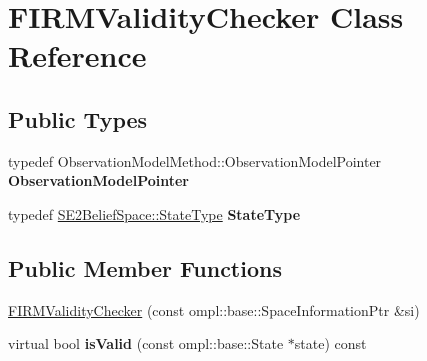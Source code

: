 \hypertarget{class_f_i_r_m_validity_checker}{\section{\-F\-I\-R\-M\-Validity\-Checker \-Class \-Reference}
\label{class_f_i_r_m_validity_checker}
}
\subsection*{\-Public \-Types}
\begin{DoxyCompactItemize}
\item 
\hypertarget{class_f_i_r_m_validity_checker_ac646cd30f5012f2bd3298f3c93189867}{typedef \*
\-Observation\-Model\-Method\-::\-Observation\-Model\-Pointer {\bfseries \-Observation\-Model\-Pointer}}\label{class_f_i_r_m_validity_checker_ac646cd30f5012f2bd3298f3c93189867}

\item 
\hypertarget{class_f_i_r_m_validity_checker_af45d7b29a15e458b4bc5f7d6bf714ba2}{typedef \hyperlink{class_s_e2_belief_space_1_1_state_type}{\-S\-E2\-Belief\-Space\-::\-State\-Type} {\bfseries \-State\-Type}}\label{class_f_i_r_m_validity_checker_af45d7b29a15e458b4bc5f7d6bf714ba2}

\end{DoxyCompactItemize}
\subsection*{\-Public \-Member \-Functions}
\begin{DoxyCompactItemize}
\item 
\hyperlink{class_f_i_r_m_validity_checker_a6721f3a590c4ee967f57361aaba79b9d}{\-F\-I\-R\-M\-Validity\-Checker} (const ompl\-::base\-::\-Space\-Information\-Ptr \&si)
\item 
\hypertarget{class_f_i_r_m_validity_checker_a29fbd40e9a25430b7f5e296abe654f0b}{virtual bool {\bfseries is\-Valid} (const ompl\-::base\-::\-State $\ast$state) const }\label{class_f_i_r_m_validity_checker_a29fbd40e9a25430b7f5e296abe654f0b}

\end{DoxyCompactItemize}


